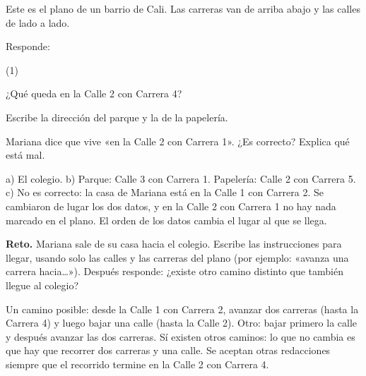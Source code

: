 \documentclass[11pt]{article}
\begin{document}
\begin{preguntas}
\pregunta Este es el plano de un barrio de Cali. Las carreras van de arriba abajo y las
calles de lado a lado.

\begin{center}
\end{center}

Responde:
\begin{opciones*}(1)
  \item ¿Qué queda en la Calle 2 con Carrera 4?
  \item Escribe la dirección del parque y la de la papelería.
  \item Mariana dice que vive «en la Calle 2 con Carrera 1». ¿Es correcto? Explica qué está mal.
\end{opciones*}
\begin{solucion}[4cm]
a) El colegio. \quad b) Parque: Calle 3 con Carrera 1. Papelería: Calle 2 con Carrera 5.
\quad c) No es correcto: la casa de Mariana está en la Calle 1 con Carrera 2. Se cambiaron de
lugar los dos datos, y en la Calle 2 con Carrera 1 no hay nada marcado en el plano. El orden
de los datos cambia el lugar al que se llega.
\end{solucion}

\pregunta \textbf{Reto.} Mariana sale de su casa hacia el colegio. Escribe las instrucciones
para llegar, usando solo las calles y las carreras del plano (por ejemplo: «avanza una
carrera hacia\ldots»). Después responde: ¿existe otro camino distinto que también llegue al
colegio?
\begin{solucion}
Un camino posible: desde la Calle 1 con Carrera 2, avanzar dos carreras (hasta la Carrera 4)
y luego bajar una calle (hasta la Calle 2). Otro: bajar primero la calle y después avanzar las
dos carreras. Sí existen otros caminos: lo que no cambia es que hay que recorrer dos carreras
y una calle. Se aceptan otras redacciones siempre que el recorrido termine en la Calle 2 con
Carrera 4.
\end{solucion}

\end{preguntas}
\end{document}
